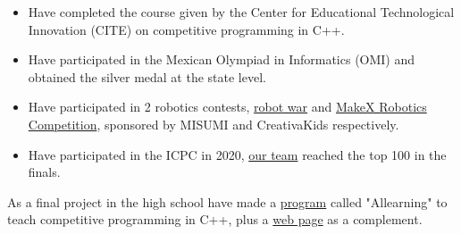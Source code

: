 \documentclass[10pt,a4paper,ragged2e,withhyper]{altacv}
\begin{document}
\begin{paracol}{2}
  \begin{itemize}
    \item Have completed the course given by the Center for Educational Technological Innovation (CITE) on competitive programming in C++.
    \item Have participated in the Mexican Olympiad in Informatics (OMI) and obtained the silver medal at the state level.
  \end{itemize}
  \divider
  \begin{itemize}
    \item Have participated in 2 robotics contests, {\href{https://drive.google.com/file/d/1xETjexZx_X1Bg46y_-m8kKneEbaz48dQ/view?usp=sharing}{\color{blue}robot war\color{black}}} and {\href{https://drive.google.com/file/d/1QcXzJbDVQ1dSvtQrdd_j387KvKlfXH8J/view?usp=sharing}{\color{blue}MakeX Robotics Competition\color{black}}}, sponsored by MISUMI and CreativaKids respectively.
  \end{itemize}
  \divider
  \begin{itemize}
    \item Have participated in the ICPC in 2020, {\href{https://drive.google.com/file/d/1OwYn_YItOoTw_DI-Dajlrwc_oC57Rv6G/view?usp=sharing}{\color{blue}our team\color{black}}} reached the top 100 in the finals.
  \end{itemize}

  \switchcolumn

  \divider

  {As a final project in the high school have made a {\href{https://github.com/ElKPROOB/Proyecto-Aula}{\color{blue}program\color{black}}} called "Allearning" to teach competitive programming in C++, plus a {\href{https://github.com/ElKPROOB/Proyecto_Aula_W}{\color{blue}web page\color{black}}} as a complement.}
  \divider


\end{paracol}
\end{document}
